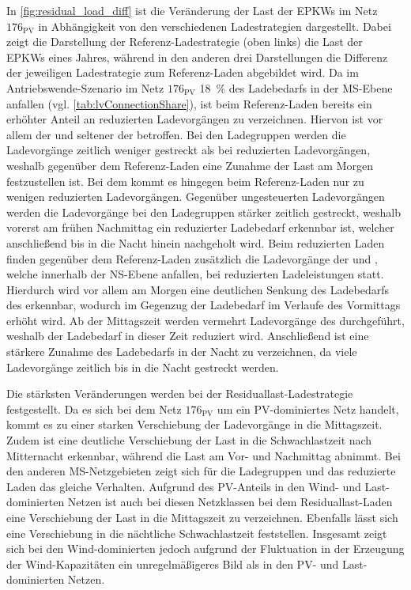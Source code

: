 

In \autoref{fig:residual_load_diff} ist die Veränderung der Last der \glspl{EPKW} im Netz \(176_{\text{PV}}\) in Abhängigkeit von den verschiedenen Ladestrategien dargestellt.
Dabei zeigt die Darstellung der Referenz-Ladestrategie (oben links) die Last der \glspl{EPKW} eines Jahres, während in den anderen drei Darstellungen die Differenz der jeweiligen Ladestrategie zum Referenz-Laden abgebildet wird.
Da im Antriebswende-Szenario im Netz \(176_{\text{PV}}\) \SI{18}{\percent} des Ladebedarfs in der \gls{MS}-Ebene anfallen (vgl. \autoref{tab:lvConnectionShare}), ist beim Referenz-Laden bereits ein erhöhter Anteil an reduzierten Ladevorgängen zu verzeichnen.
Hiervon ist vor allem der \UC \Firmeparkplatz und seltener der \UC \zH betroffen.
Bei den Ladegruppen werden die Ladevorgänge zeitlich weniger gestreckt als bei reduzierten Ladevorgängen, weshalb gegenüber dem Referenz-Laden eine Zunahme der Last am Morgen festzustellen ist.
Bei dem \UC \zH kommt es hingegen beim Referenz-Laden nur zu wenigen reduzierten Ladevorgängen.
Gegenüber ungesteuerten Ladevorgängen werden die Ladevorgänge bei den Ladegruppen stärker zeitlich gestreckt, weshalb vorerst am frühen Nachmittag ein reduzierter Ladebedarf erkennbar ist, welcher anschließend bis in die Nacht hinein nachgeholt wird.
Beim reduzierten Laden finden gegenüber dem Referenz-Laden zusätzlich die Ladevorgänge der \UCs \zH und \Firmeparkplatzdot, welche innerhalb der \gls{NS}-Ebene anfallen, bei reduzierten Ladeleistungen statt.
Hierdurch wird vor allem am Morgen eine deutlichen Senkung des Ladebedarfs des \UC \Firmeparkplatz erkennbar, wodurch im Gegenzug der Ladebedarf im Verlaufe des Vormittags erhöht wird.
Ab der Mittagszeit werden vermehrt Ladevorgänge des \UC \zH durchgeführt, weshalb der Ladebedarf in dieser Zeit reduziert wird.
Anschließend ist eine stärkere Zunahme des Ladebedarfs in der Nacht zu verzeichnen, da viele Ladevorgänge zeitlich bis in die Nacht gestreckt werden.



Die stärksten Veränderungen werden bei der Residuallast-Ladestrategie festgestellt.
Da es sich bei dem Netz \(176_{\text{PV}}\) um ein \gls{PV}-dominiertes Netz handelt, kommt es zu einer starken Verschiebung der Ladevorgänge in die Mittagszeit.
Zudem ist eine deutliche Verschiebung der Last in die Schwachlastzeit nach Mitternacht erkennbar, während die Last am Vor- und Nachmittag abnimmt.
Bei den anderen \gls{MS}-Netzgebieten zeigt sich für die Ladegruppen und das reduzierte Laden das gleiche Verhalten.
Aufgrund des \gls{PV}-Anteils in den Wind- und Last-dominierten Netzen ist auch bei diesen Netzklassen bei dem Residuallast-Laden eine Verschiebung der Last in die Mittagszeit zu verzeichnen.
Ebenfalls lässt sich eine Verschiebung in die nächtliche Schwachlastzeit feststellen.
Insgesamt zeigt sich bei den Wind-dominierten jedoch aufgrund der Fluktuation in der Erzeugung der Wind-Kapazitäten ein unregelmäßigeres Bild als in den \gls{PV}- und Last-dominierten Netzen.


